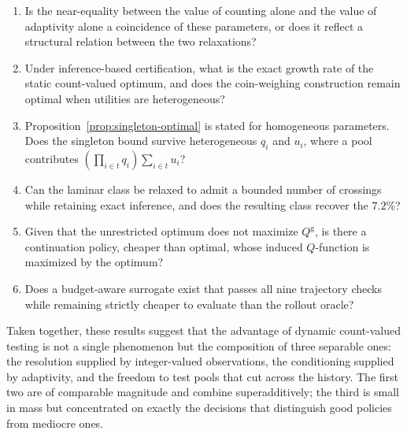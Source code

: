 \begin{enumerate}
  \item Is the near-equality between the value of counting alone and the value
    of adaptivity alone a coincidence of these parameters, or does it reflect a
    structural relation between the two relaxations?

  \item Under inference-based certification, what is the exact growth rate of the
    static count-valued optimum, and does the coin-weighing construction remain
    optimal when utilities are heterogeneous?

  \item Proposition~\ref{prop:singleton-optimal} is stated for homogeneous
    parameters. Does the singleton bound survive heterogeneous $q_i$ and $u_i$,
    where a pool contributes $\left(\prod_{i\in t}q_i\right)\sum_{i\in t}u_i$?

  \item Can the laminar class be relaxed to admit a bounded number of crossings
    while retaining exact inference, and does the resulting class recover the
    $7.2\%$?

  \item Given that the unrestricted optimum does not maximize $Q^{\mathrm{g}}$,
    is there a continuation policy, cheaper than optimal, whose induced
    $Q$-function is maximized by the optimum?

  \item Does a budget-aware surrogate exist that passes all nine trajectory
    checks while remaining strictly cheaper to evaluate than the rollout oracle?
\end{enumerate}

Taken together, these results suggest that the advantage of dynamic count-valued
testing is not a single phenomenon but the composition of three separable ones:
the resolution supplied by integer-valued observations, the conditioning
supplied by adaptivity, and the freedom to test pools that cut across the
history. The first two are of comparable magnitude and combine
superadditively; the third is small in mass but concentrated on exactly the
decisions that distinguish good policies from mediocre ones.
